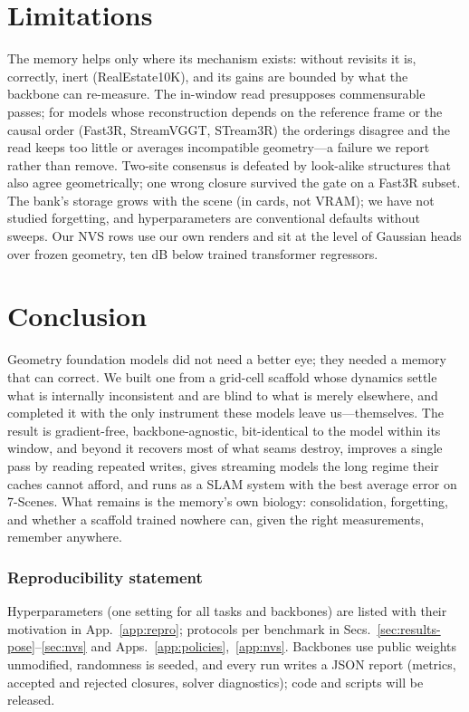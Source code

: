 \documentclass{article}
\begin{document}
\section{Limitations}
\label{sec:limitations}
The memory helps only where its mechanism exists: without revisits it is,
correctly, inert (RealEstate10K), and its gains are bounded by what the
backbone can re-measure. The in-window read presupposes commensurable passes;
for models whose reconstruction depends on the reference frame or the causal
order (Fast3R, StreamVGGT, STream3R) the orderings disagree and the read
keeps too little or averages incompatible geometry---a failure we report
rather than remove. Two-site consensus is defeated by look-alike structures that also agree
geometrically; one wrong closure survived the gate on a Fast3R subset. The bank's storage grows with the scene
(in cards, not VRAM); we have not studied forgetting, and hyperparameters are
conventional defaults without sweeps. Our NVS rows use our own renders and sit
at the level of Gaussian heads over frozen geometry, ten dB below trained
transformer regressors.

\vspace{-1mm}
\section{Conclusion}
\vspace{-1mm}
Geometry foundation models did not need a better eye; they needed a memory
that can correct. We built one from a grid-cell scaffold whose dynamics
settle what is internally inconsistent and are blind to what is merely
elsewhere, and completed it with the only instrument these models leave
us---themselves. The result is gradient-free, backbone-agnostic, bit-identical
to the model within its window, and beyond it recovers most of what seams
destroy, improves a single pass by reading repeated writes, gives streaming
models the long regime their caches cannot afford, and runs as a SLAM system with the best average error on 7-Scenes. What remains is the memory's own biology:
consolidation, forgetting, and whether a scaffold trained nowhere can, given
the right measurements, remember anywhere.

\vspace{-3mm}
\subsubsection*{Reproducibility statement}
\vspace{-1mm}
Hyperparameters (one setting for all tasks and backbones) are listed with
their motivation in App.~\ref{app:repro}; protocols per benchmark in
Secs.~\ref{sec:results-pose}--\ref{sec:nvs} and Apps.~\ref{app:policies},~\ref{app:nvs}.
Backbones use public weights unmodified, randomness is seeded, and every run
writes a JSON report (metrics, accepted and rejected closures, solver
diagnostics); code and scripts will be released.
\end{document}
